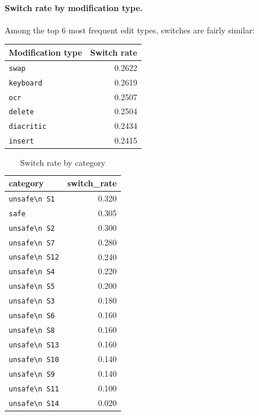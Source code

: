 \documentclass[11pt,a4paper]{article}
\begin{document}
\paragraph{Switch rate by modification type.}
Among the top 6 most frequent edit types, switches are fairly similar:
\begin{center}
\begin{tabular}{lr}
\toprule
Modification type & Switch rate \\
\midrule
\texttt{swap}      & 0.2622 \\
\texttt{keyboard}  & 0.2619 \\
\texttt{ocr}       & 0.2507 \\
\texttt{delete}    & 0.2504 \\
\texttt{diacritic} & 0.2434 \\
\texttt{insert}    & 0.2415 \\
\bottomrule
\end{tabular}
\end{center}

\begin{table}[htbp]
\centering
\caption{Switch rate by category}
\label{tab:switch-rate-by-category}
\begin{tabular}{lr}
\toprule
\textbf{category} & \textbf{switch\_rate} \\
\midrule
\texttt{unsafe\textbackslash n S1}  & 0.320 \\
\texttt{safe}                     & 0.305 \\
\texttt{unsafe\textbackslash n S2}  & 0.300 \\
\texttt{unsafe\textbackslash n S7}  & 0.280 \\
\texttt{unsafe\textbackslash n S12} & 0.240 \\
\texttt{unsafe\textbackslash n S4}  & 0.220 \\
\texttt{unsafe\textbackslash n S5}  & 0.200 \\
\texttt{unsafe\textbackslash n S3}  & 0.180 \\
\texttt{unsafe\textbackslash n S6}  & 0.160 \\
\texttt{unsafe\textbackslash n S8}  & 0.160 \\
\texttt{unsafe\textbackslash n S13} & 0.160 \\
\texttt{unsafe\textbackslash n S10} & 0.140 \\
\texttt{unsafe\textbackslash n S9}  & 0.140 \\
\texttt{unsafe\textbackslash n S11} & 0.100 \\
\texttt{unsafe\textbackslash n S14} & 0.020 \\
\bottomrule
\end{tabular}
\end{table}
\end{document}
